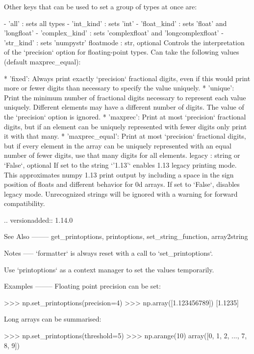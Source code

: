 \begin{DoxyVerb}
    Other keys that can be used to set a group of types at once are:

    - 'all' : sets all types
    - 'int_kind' : sets 'int'
    - 'float_kind' : sets 'float' and 'longfloat'
    - 'complex_kind' : sets 'complexfloat' and 'longcomplexfloat'
    - 'str_kind' : sets 'numpystr'
floatmode : str, optional
    Controls the interpretation of the `precision` option for
    floating-point types. Can take the following values
    (default maxprec_equal):

    * 'fixed': Always print exactly `precision` fractional digits,
            even if this would print more or fewer digits than
            necessary to specify the value uniquely.
    * 'unique': Print the minimum number of fractional digits necessary
            to represent each value uniquely. Different elements may
            have a different number of digits. The value of the
            `precision` option is ignored.
    * 'maxprec': Print at most `precision` fractional digits, but if
            an element can be uniquely represented with fewer digits
            only print it with that many.
    * 'maxprec_equal': Print at most `precision` fractional digits,
            but if every element in the array can be uniquely
            represented with an equal number of fewer digits, use that
            many digits for all elements.
legacy : string or `False`, optional
    If set to the string `'1.13'` enables 1.13 legacy printing mode. This
    approximates numpy 1.13 print output by including a space in the sign
    position of floats and different behavior for 0d arrays. If set to
    `False`, disables legacy mode. Unrecognized strings will be ignored
    with a warning for forward compatibility.

    .. versionadded:: 1.14.0

See Also
--------
get_printoptions, printoptions, set_string_function, array2string

Notes
-----
`formatter` is always reset with a call to `set_printoptions`.

Use `printoptions` as a context manager to set the values temporarily.

Examples
--------
Floating point precision can be set:

>>> np.set_printoptions(precision=4)
>>> np.array([1.123456789])
[1.1235]

Long arrays can be summarised:

>>> np.set_printoptions(threshold=5)
>>> np.arange(10)
array([0, 1, 2, ..., 7, 8, 9])


\end{DoxyVerb}
